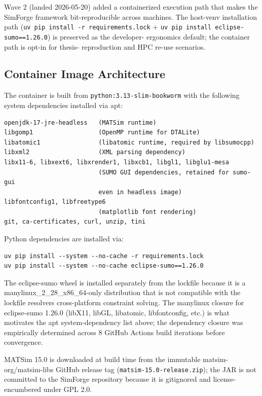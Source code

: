 Wave 2 (landed 2026-05-20) added a containerized execution path that
makes the SimForge framework bit-reproducible across machines. The
host-venv installation path
(\texttt{uv\ pip\ install\ -r\ requirements.lock} +
\texttt{uv\ pip\ install\ eclipse-sumo==1.26.0}) is preserved as the
developer- ergonomics default; the container path is opt-in for thesis-
reproduction and HPC re-use scenarios.

\subsection{Container Image
Architecture}\label{3111-container-image-architecture}

The container is built from \texttt{python:3.13-slim-bookworm} with the
following system dependencies installed via apt:

\begin{verbatim}
openjdk-17-jre-headless   (MATSim runtime)
libgomp1                  (OpenMP runtime for DTALite)
libatomic1                (libatomic runtime, required by libsumocpp)
libxml2                   (XML parsing dependency)
libx11-6, libxext6, libxrender1, libxcb1, libgl1, libglu1-mesa
                          (SUMO GUI dependencies, retained for sumo-gui
                          even in headless image)
libfontconfig1, libfreetype6
                          (matplotlib font rendering)
git, ca-certificates, curl, unzip, tini
\end{verbatim}

Python dependencies are installed via:

\begin{verbatim}
uv pip install --system --no-cache -r requirements.lock
uv pip install --system --no-cache eclipse-sumo==1.26.0
\end{verbatim}

The eclipse-sumo wheel is installed separately from the lockfile because
it is a manylinux\_2\_28\_x86\_64-only distribution that is not
compatible with the lockfile resolver\textquotesingle s cross-platform
constraint solving. The manylinux closure for eclipse-sumo 1.26.0
(libX11, libGL, libatomic, libfontconfig, etc.) is what motivates the
apt system-dependency list above; the dependency closure was empirically
determined across 8 GitHub Actions build iterations before convergence.

MATSim 15.0 is downloaded at build time from the immutable
matsim-org/matsim-libs GitHub release tag
(\texttt{matsim-15.0-release.zip}); the JAR is not committed to the
SimForge repository because it is gitignored and license-encumbered
under GPL 2.0.

